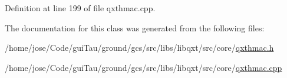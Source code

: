 Definition at line 199 of file qxthmac.\-cpp.



The documentation for this class was generated from the following files\-:\begin{DoxyCompactItemize}
\item 
/home/jose/\-Code/gui\-Tau/ground/gcs/src/libs/libqxt/src/core/\hyperlink{qxthmac_8h}{qxthmac.\-h}\item 
/home/jose/\-Code/gui\-Tau/ground/gcs/src/libs/libqxt/src/core/\hyperlink{qxthmac_8cpp}{qxthmac.\-cpp}\end{DoxyCompactItemize}
